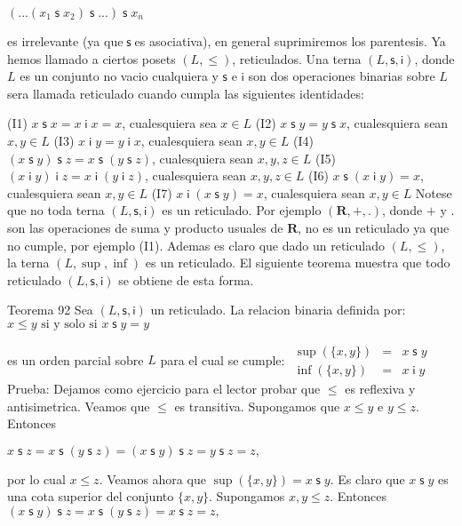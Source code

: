 \(\displaystyle (...(x_{1}\;\mathsf{s\;}x_{2})\;\mathsf{s\;}...)\;\mathsf{s\;}x_{n} \)

es irrelevante (ya que\(\;\mathsf{s\;}\)es asociativa), en general suprimiremos los parentesis.
Ya hemos llamado a ciertos posets \((L,\leq )\), reticulados. Una terna \((L, \mathsf{s},\mathsf{i})\), donde \(L\) es un conjunto no vacio cualquiera y \( \mathsf{s}\) e \(\mathsf{i}\) son dos operaciones binarias sobre \(L\) sera llamada reticulado cuando cumpla las siguientes identidades:

(I1) \(x\;\mathsf{s}\;x=x\mathsf{\;i\;}x=x\), cualesquiera sea \(x\in L\)
(I2) \(x\mathsf{\;s\;}y=y\;\mathsf{s}\;x\), cualesquiera sean \(x,y\in L\)
(I3) \(x\mathsf{\;i\;}y=y\mathsf{\;i\;}x\), cualesquiera sean \(x,y\in L\)
(I4) \((x\mathsf{\;s\;}y)\;\mathsf{s}\;z=x\;\mathsf{s}\;(y\;\mathsf{s} \;z)\), cualesquiera sean \(x,y,z\in L\)
(I5) \((x\mathsf{\;i\;}y)\mathsf{\;i\;}z=x\mathsf{\;i\;}(y\mathsf{\;i\; }z)\), cualesquiera sean \(x,y,z\in L\)
(I6) \(x\;\mathsf{s}\;(x\mathsf{\;i\;}y)=x\), cualesquiera sean \(x,y\in L\)
(I7) \(x\mathsf{\;i\;}(x\;\mathsf{s}\;y)=x\), cualesquiera sean \(x,y\in L\)
Notese que no toda terna \((L,\mathsf{s},\mathsf{i})\) es un reticulado. Por ejemplo \((\mathbf{R},+,.)\), donde \(+\) y \(.\) son las operaciones de suma y producto usuales de \(\mathbf{R}\), no es un reticulado ya que no cumple, por ejemplo (I1). Ademas es claro que dado un reticulado \((L,\leq )\), la terna \( (L,\sup ,\inf )\) es un reticulado. El siguiente teorema muestra que todo reticulado \((L,\mathsf{s},\mathsf{i})\) se obtiene de esta forma.

Teorema 92 Sea \((L,\mathsf{s},\mathsf{i})\) un reticulado. La relacion binaria definida por:
\(\displaystyle x\leq y\text{ si y solo si }x\;\mathsf{s}\;y=y \)

es un orden parcial sobre \(L\) para el cual se cumple:
\(\displaystyle \begin{array}{rcl} \sup (\{x,y\}) & =& x\;\mathsf{s}\;y \\ \inf (\{x,y\}) & =& x\mathsf{\;i\;}y \end{array} \)
Prueba: Dejamos como ejercicio para el lector probar que \(\leq \) es reflexiva y antisimetrica. Veamos que \(\leq \) es transitiva. Supongamos que \(x\leq y\) e \( y\leq z\). Entonces

\(\displaystyle x\;\mathsf{s\;}z=x\;\mathsf{s\;}(y\;\mathsf{s\;}z)=(x\;\mathsf{s\;}y)\; \mathsf{s\;}z=y\;\mathsf{s\;}z=z, \)

por lo cual \(x\leq z\). Veamos ahora que \(\sup (\{x,y\})=x\;\mathsf{s\;}y\). Es claro que \(x\;\mathsf{s\;}y\) es una cota superior del conjunto \(\{x,y\}\). Supongamos \(x,y\leq z\). Entonces
\(\displaystyle (x\;\mathsf{s\;}y)\;\mathsf{s\;}z=x\;\mathsf{s\;}(y\;\mathsf{s\;}z)=x\; \mathsf{s\;}z=z, \)

